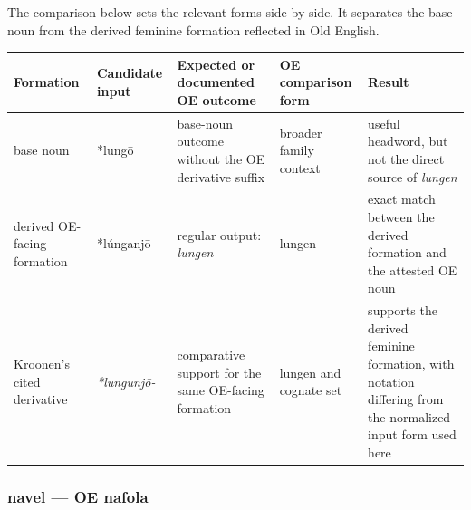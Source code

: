 \documentclass[
  british,
  a4paper,
]{article}
\newcounter{none} %
\begin{document}
The comparison below sets the relevant forms side by side. It separates
the base noun from the derived feminine formation reflected in Old
English.

{\def\LTcaptype{none} %
\begin{longtable}[]{@{}
  >{\raggedright\arraybackslash}p{}
  >{\raggedright\arraybackslash}p{}
  >{\raggedright\arraybackslash}p{}
  >{\raggedright\arraybackslash}p{}
  >{\raggedright\arraybackslash}p{}@{}}
\toprule\noalign{}
\begin{minipage}[b]{\linewidth}\raggedright
Formation
\end{minipage} & \begin{minipage}[b]{\linewidth}\raggedright
Candidate input
\end{minipage} & \begin{minipage}[b]{\linewidth}\raggedright
Expected or documented OE outcome
\end{minipage} & \begin{minipage}[b]{\linewidth}\raggedright
OE comparison form
\end{minipage} & \begin{minipage}[b]{\linewidth}\raggedright
Result
\end{minipage} \\
\midrule\noalign{}
\endhead
\bottomrule\noalign{}
\endlastfoot
base noun & *lungō & base-noun outcome without the OE derivative suffix
& broader family context & useful headword, but not the direct source of
\emph{lungen} \\
derived OE-facing formation & *lúnganjō & regular output: \emph{lungen}
& lungen & exact match between the derived formation and the attested OE
noun \\
Kroonen's cited derivative & \emph{*lungunjō-} & comparative support for
the same OE-facing formation & lungen and cognate set & supports the
derived feminine formation, with notation differing from the normalized
input form used here \\
\end{longtable}
}

\subsubsection{navel --- OE nafola}\label{navel-oe-nafola}
\end{document}
